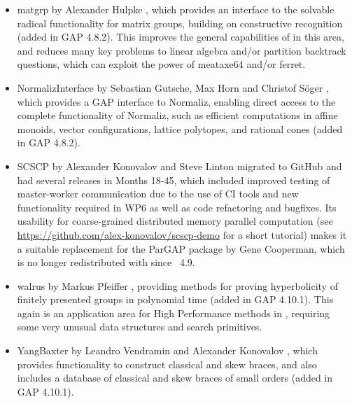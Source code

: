 \begin{itemize}
\item
{\sf matgrp}  by Alexander Hulpke \cite{matgrp}, which provides an interface
to the solvable radical functionality for matrix groups, building on
constructive recognition (added in GAP 4.8.2). This improves the
general capabilities of \GAP in this area, and reduces many key
problems to linear algebra and/or partition backtrack questions, which
can exploit the power of {\sf meataxe64} and/or {\sf ferret}.

\item
{\sf NormalizInterface} by Sebastian Gutsche, Max Horn and
Christof S\"oger \cite{NormalizInterface}, which provides a GAP interface to Normaliz, enabling
direct access to the complete functionality of Normaliz, such as efficient
computations in affine monoids, vector configurations, lattice
polytopes, and rational cones (added in GAP 4.8.2). 

\item
{\sf SCSCP} \cite{SCSCP} by Alexander Konovalov
and Steve Linton migrated to GitHub and had several releases
in Months 18-45, which included improved testing of 
master-worker communication due to the use of
CI tools and new functionality required in WP6 as well as
code refactoring and bugfixes. Its usability for 
coarse-grained distributed memory parallel computation
(see \url{https://github.com/alex-konovalov/scscp-demo}
for a short tutorial) makes it a suitable replacement for the {\sf ParGAP}
package by Gene Cooperman, which is no longer redistributed 
with \GAP since \GAP~4.9.

\item
{\sf walrus} by Markus Pfeiffer \cite{walrus}, providing methods for proving 
hyperbolicity of finitely presented groups in polynomial time
(added in GAP 4.10.1). This again is an application area for High
Performance methods in \GAP, requiring some very unusual data
structures and search primitives.

\item
{\sf YangBaxter} by Leandro Vendramin and Alexander Konovalov \cite{YangBaxter}, 
which provides functionality to construct classical and 
skew braces, and also includes a database of classical 
and skew braces of small orders (added in GAP 4.10.1).

\end{itemize}
